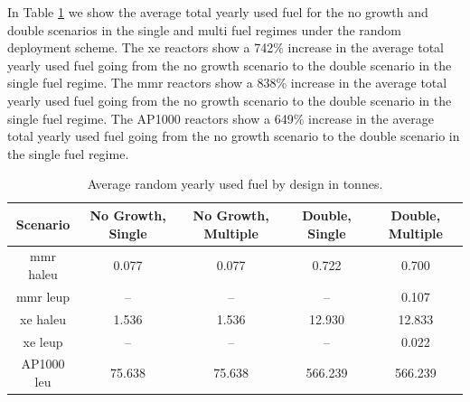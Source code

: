 In Table \ref{tab:random_used_avg} we show the average total yearly used fuel for the no growth and double scenarios in the single and multi fuel regimes under the random deployment scheme. The \gls{xe} reactors show a 742\% increase in the average total yearly used fuel going from the no growth scenario to the double scenario in the single fuel regime. The \gls{mmr} reactors show a 838\% increase in the average total yearly used fuel going from the no growth scenario to the double scenario in the single fuel regime. The AP1000 reactors show a 649\% increase in the average total yearly used fuel going from the no growth scenario to the double scenario in the single fuel regime.

\begin{table}[H]
    \centering
    \caption{Average random yearly used fuel by design in tonnes.}
    \label{tab:random_used_avg}
    \begin{tabular}{c c c c c}
       \hline
       Scenario & No Growth, Single & No Growth, Multiple & Double, Single & Double, Multiple  \\
       \hline
       \gls{mmr} \gls{haleu}   & 0.077    & 0.077   & 0.722    & 0.700    \\
       \gls{mmr} \gls{leup}    & --       & --      & --       & 0.107    \\
       \gls{xe} \gls{haleu}    & 1.536    & 1.536   & 12.930   & 12.833   \\
       \gls{xe} \gls{leup}     & --       & --      & --       & 0.022    \\
       AP1000 \gls{leu}        & 75.638   & 75.638  & 566.239  & 566.239  \\
       \hline
    \end{tabular}
\end{table}

